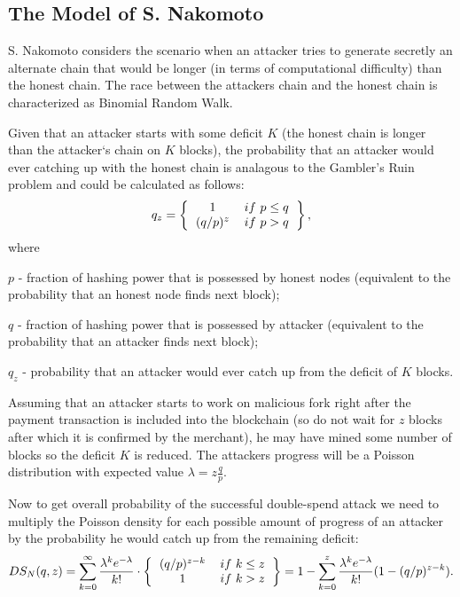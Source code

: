 \documentclass[10pt,a4paper]{article}
\numberwithin{equation}{section} %
\theoremstyle{plain}
\theoremstyle{definition}
\theoremstyle{remark}
\begin{document}
	\subsection{The Model of S. Nakomoto}
	
	S. Nakomoto considers the scenario when an attacker tries to generate secretly an alternate chain that would be longer (in terms of computational difficulty) than the honest chain. The race between the attackers chain and the honest chain is characterized as Binomial Random Walk.
	
	Given that an attacker starts with some deficit \(K\) (the honest chain is longer than the attacker`s chain on \(K\) blocks), the probability that an attacker would ever catching up with the honest chain is analagous to the Gambler's Ruin problem and could be calculated as follows:
	\[ q_z = 
	    \left \{
            \begin{tabular}{cc}
                1       & \(if\  p \leq q\) \\
                \((q/p)^z\) & \(if\  p > q\) \\
            \end{tabular}
        \right \},
	\]
	where
	
	\(p\) - fraction of hashing power that is possessed by honest nodes (equivalent to the probability that an honest node finds next block);
	
	\(q\) - fraction of hashing power that is possessed by attacker (equivalent to the probability that an attacker finds next block);
	
	\(q_z\) - probability that an attacker would ever catch up from the deficit of \(K\) blocks.
	
	Assuming that an attacker starts to work on malicious fork right after the payment transaction is included into the blockchain (so do not wait for \(z\) blocks after which it is confirmed by the merchant), he may have mined some number of blocks so the deficit \(K\) is reduced. The attackers progress will be a Poisson distribution with expected value \( \lambda = z\frac{q}{p} \).
	
	Now to get overall probability of the successful double-spend attack we need to multiply the Poisson density for each possible amount of progress of an attacker by the probability he would catch up from the remaining deficit:
	\begin{equation} \label{eq:nak_DS}
	    DS_N(q,z) =
	    \sum_{k=0}^{\infty} \frac{\lambda^k e^{-\lambda}}{k!} \cdot
	    \left \{
            \begin{tabular}{cc}
                \((q/p)^{z-k}\) & \(if\  k \leq z\) \\
                1       & \(if\  k > z\) \\
            \end{tabular}
        \right \}
        =
        1 - \sum_{k=0}^{z} \frac{\lambda^k e^{-\lambda}}{k!}(1 - (q/p)^{z-k}).
	\end{equation}
	
\end{document}
